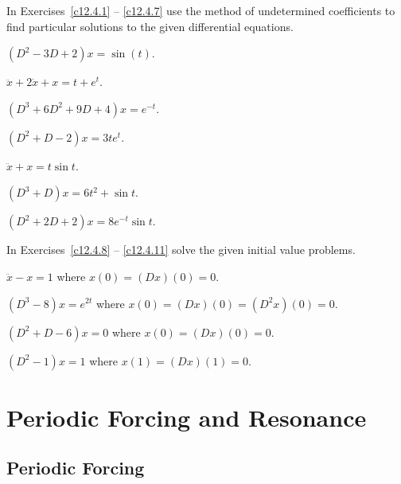 \documentclass{ximera}
\begin{document}
\noindent In Exercises~\ref{c12.4.1} -- \ref{c12.4.7} use the method of 
undetermined coefficients to find particular solutions to the given 
differential equations.
\begin{exercise}  \label{c12.4.1}
$(D^2-3D+2)x = \sin(t)$.
\end{exercise}
\begin{exercise}  \label{c12.4.2}
$\ddot{x}+2\dot{x}+x = t + e^t$.
\end{exercise}
\begin{exercise}  \label{c12.4.3}
$(D^3+6D^2+9D+4)x = e^{-t}$.
\end{exercise}
\begin{exercise}  \label{c12.4.4}
$(D^2+D-2)x = 3te^t$.
\end{exercise}
\begin{exercise}  \label{c12.4.5}
$\ddot{x}+x = t\sin t$.
\end{exercise}
\begin{exercise}  \label{c12.4.6}
$(D^3+D)x = 6t^2+\sin t$.
\end{exercise}
\begin{exercise}  \label{c12.4.7}
$(D^2+2D+2)x = 8e^{-t}\sin t$.
\end{exercise}

\noindent In Exercises~\ref{c12.4.8}  -- \ref{c12.4.11} solve the given 
initial value problems.
\begin{exercise}  \label{c12.4.8}
$\ddot{x}-x = 1$ where $x(0)=(Dx)(0)=0$.
\end{exercise}
\begin{exercise}  \label{c12.4.9}
$(D^3-8)x = e^{2t}$ where $x(0)=(Dx)(0)=(D^2x)(0)=0$.
\end{exercise}
\begin{exercise}  \label{c12.4.10}
$(D^2+D-6)x = 0$ where $x(0)=(Dx)(0)=0$.
\end{exercise}
\begin{exercise}  \label{c12.4.11}
$(D^2-1)x = 1$ where $x(1)=(Dx)(1)=0$.
\end{exercise}


\section{Periodic Forcing and Resonance}
\label{S:resonance}

\subsection*{Periodic Forcing}
\end{document}
